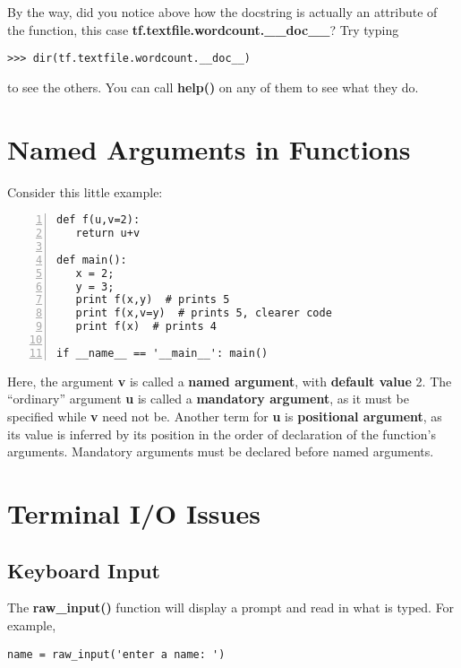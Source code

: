By the way, did you notice above how the docstring is actually an
attribute of the function, this case {\bf
tf.textfile.wordcount.\_\_doc\_\_}?  Try typing

\begin{Verbatim}[fontsize=\relsize{-2}]
>>> dir(tf.textfile.wordcount.__doc__)
\end{Verbatim}

to see the others.  You can call {\bf help()} on any of them to see what
they do.

\section{Named Arguments in Functions}
\label{namedargs}

Consider this little example:

\begin{Verbatim}[fontsize=\relsize{-2},numbers=left]
def f(u,v=2):
   return u+v

def main():
   x = 2;
   y = 3;
   print f(x,y)  # prints 5
   print f(x,v=y)  # prints 5, clearer code
   print f(x)  # prints 4

if __name__ == '__main__': main()
\end{Verbatim}

Here, the argument {\bf v} is called a {\bf named argument}, with {\bf
default value} 2.  The ``ordinary'' argument {\bf u} is called a {\bf
mandatory argument}, as it must be specified while {\bf v} need not be.
Another term for {\bf u} is {\bf positional argument}, as its value is
inferred by its position in the order of declaration of the function's
arguments.  Mandatory arguments must be declared before named arguments.

\section{Terminal I/O Issues}

\subsection{Keyboard Input}
\label{key}

The {\bf raw\_input()} function will display a prompt and read in what
is typed.  For example,

\begin{Verbatim}[fontsize=\relsize{-2}]
name = raw_input('enter a name: ')
\end{Verbatim}

